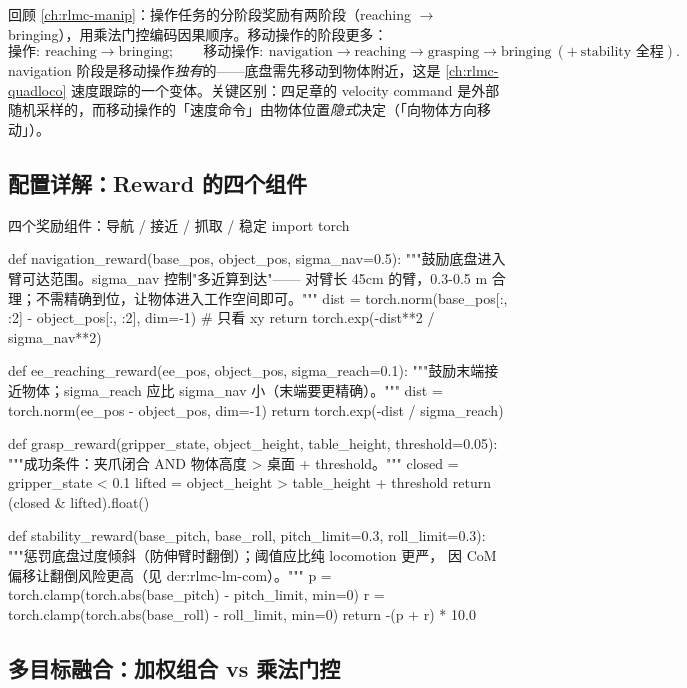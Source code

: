 回顾 \cref{ch:rlmc-manip}：操作任务的分阶段奖励有两阶段（reaching $\to$ bringing），用乘法门控编码因果顺序。移动操作的阶段更多：
\begin{equation*}
\text{操作}:\ \text{reaching}\to\text{bringing};\qquad
\text{移动操作}:\ \text{navigation}\to\text{reaching}\to\text{grasping}\to\text{bringing}\ (+\ \text{stability 全程}).
\end{equation*}
navigation 阶段是移动操作\emph{独有}的——底盘需先移动到物体附近，这是 \cref{ch:rlmc-quadloco} 速度跟踪的一个变体。关键区别：四足章的 velocity command 是外部随机采样的，而移动操作的「速度命令」由物体位置\emph{隐式}决定（「向物体方向移动」）。

\subsection{配置详解：Reward 的四个组件}
\label{sec:rlmc-lm-reward-comp}

\begin{codebox}[Python]{四个奖励组件：导航 / 接近 / 抓取 / 稳定}
import torch

def navigation_reward(base_pos, object_pos, sigma_nav=0.5):
    """鼓励底盘进入臂可达范围。sigma_nav 控制"多近算到达"——
    对臂长 45cm 的臂，0.3-0.5 m 合理；不需精确到位，让物体进入工作空间即可。"""
    dist = torch.norm(base_pos[:, :2] - object_pos[:, :2], dim=-1)  # 只看 xy
    return torch.exp(-dist**2 / sigma_nav**2)

def ee_reaching_reward(ee_pos, object_pos, sigma_reach=0.1):
    """鼓励末端接近物体；sigma_reach 应比 sigma_nav 小（末端要更精确）。"""
    dist = torch.norm(ee_pos - object_pos, dim=-1)
    return torch.exp(-dist / sigma_reach)

def grasp_reward(gripper_state, object_height, table_height, threshold=0.05):
    """成功条件：夹爪闭合 AND 物体高度 > 桌面 + threshold。"""
    closed = gripper_state < 0.1
    lifted = object_height > table_height + threshold
    return (closed & lifted).float()

def stability_reward(base_pitch, base_roll, pitch_limit=0.3, roll_limit=0.3):
    """惩罚底盘过度倾斜（防伸臂时翻倒）；阈值应比纯 locomotion 更严，
    因 CoM 偏移让翻倒风险更高（见 der:rlmc-lm-com）。"""
    p = torch.clamp(torch.abs(base_pitch) - pitch_limit, min=0)
    r = torch.clamp(torch.abs(base_roll) - roll_limit, min=0)
    return -(p + r) * 10.0
\end{codebox}

\subsection{多目标融合：加权组合 vs 乘法门控}
\label{sec:rlmc-lm-reward-fuse}

